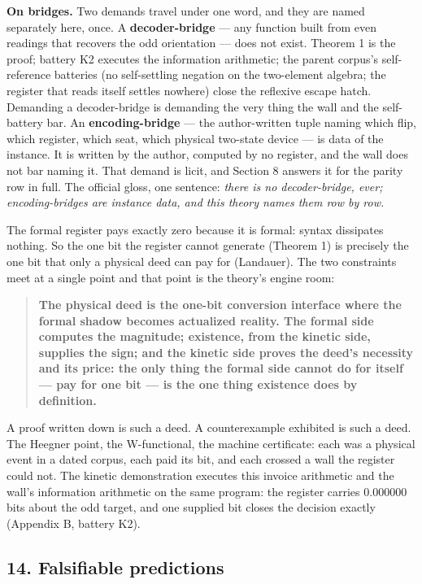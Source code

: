 \documentclass[10pt]{article}
\renewcommand{\_}{\origunderscore\allowbreak}
\begin{document}
\textbf{On bridges.} Two demands travel under one word, and they are
named separately here, once. A \textbf{decoder-bridge} --- any function
built from even readings that recovers the odd orientation --- does not
exist. Theorem 1 is the proof; battery K2 executes the information
arithmetic; the parent corpus's self-reference batteries (no
self-settling negation on the two-element algebra; the register that
reads itself settles nowhere) close the reflexive escape hatch.
Demanding a decoder-bridge is demanding the very thing the wall and the
self-battery bar. An \textbf{encoding-bridge} --- the author-written
tuple naming which flip, which register, which seat, which physical
two-state device --- is data of the instance. It is written by the
author, computed by no register, and the wall does not bar naming it.
That demand is licit, and Section 8 answers it for the parity row in
full. The official gloss, one sentence: \emph{there is no
decoder-bridge, ever; encoding-bridges are instance data, and this
theory names them row by row.}

The formal register pays exactly zero because it is formal: syntax
dissipates nothing. So the one bit the register cannot generate (Theorem
1) is precisely the one bit that only a physical deed can pay for
(Landauer). The two constraints meet at a single point and that point is
the theory's engine room:

\begin{quote}
\textbf{The physical deed is the one-bit conversion interface where the
formal shadow becomes actualized reality. The formal side computes the
magnitude; existence, from the kinetic side, supplies the sign; and the
kinetic side proves the deed's necessity and its price: the only thing
the formal side cannot do for itself --- pay for one bit --- is the one
thing existence does by definition.}
\end{quote}

A proof written down is such a deed. A counterexample exhibited is such
a deed. The Heegner point, the W-functional, the machine certificate:
each was a physical event in a dated corpus, each paid its bit, and each
crossed a wall the register could not. The kinetic demonstration
executes this invoice arithmetic and the wall's information arithmetic
on the same program: the register carries 0.000000 bits about the odd
target, and one supplied bit closes the decision exactly (Appendix B,
battery K2).

\hypertarget{falsifiable-predictions}{%
\subsection{14. Falsifiable predictions}\label{falsifiable-predictions}}
\end{document}
